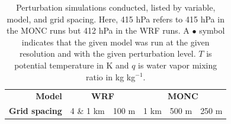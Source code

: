 \documentclass[draft]{agujournal2019}
\begin{document}
{
\begin{table}
    \centering
    \caption{Perturbation simulations conducted, listed by variable, model, and
    grid spacing. Here, 415 hPa refers to 415 hPa in the MONC runs but 412 hPa
    in the WRF runs. A $\bullet{}$ symbol indicates that the given model was run
    at the given resolution and with the given perturbation level. $T$ is
    potential temperature in K and $q$ is water vapor mixing ratio in kg
    kg$^{-1}$.}
    \label{tab:pert_runs}
    \renewcommand{\arraystretch}{0.6}
    \footnotesize
    \begin{tabular}{llrccccc}
        \multicolumn{3}{r}{\textbf{Model}} & \multicolumn{2}{c}{\textbf{WRF}} & \multicolumn{3}{c}{\textbf{MONC}} \\
        \multicolumn{3}{r}{\textbf{Grid spacing}} & 4 \& 1 km & 100 m & 1 km & 500 m & 250 m \\
        

\end{tabular}
\end{table}}
\end{document}

